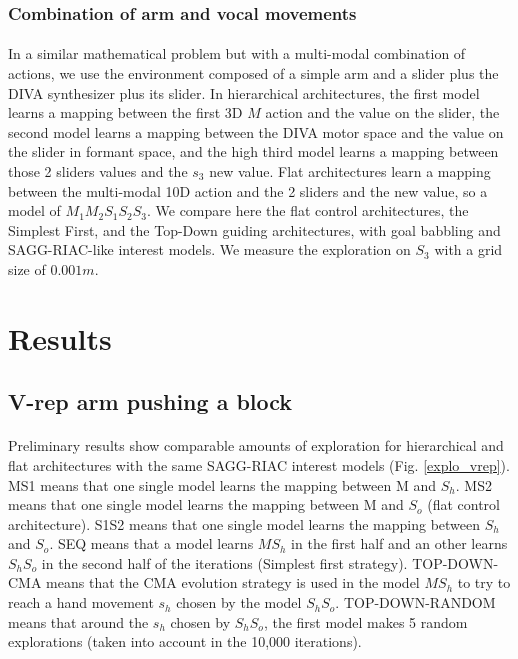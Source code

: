 \documentclass[12pt]{article}
\begin{document}

				
		\subsubsection{Combination of arm and vocal movements}

			\paragraph{}
			In a similar mathematical problem but with a multi-modal combination of actions, we use the environment composed of a simple arm and a slider plus
			the DIVA synthesizer plus its slider.
			In hierarchical architectures, the first model learns a mapping between the first 3D $M$ action and the value on the slider, the
			 second model learns a mapping between the DIVA motor space and the value on the slider in formant space, and the high third model learns a 
			 mapping between those 2 sliders values and the $s_3$ new value.
			Flat architectures learn a mapping between the multi-modal 10D action and the 2 sliders and the new value, so a model of $M_1M_2S_1S_2S_3$.
			We compare here the flat control architectures, the Simplest First, and the Top-Down guiding architectures, with goal babbling and SAGG-RIAC-like
			interest models. We measure the exploration on $S_3$ with a grid size of $0.001m$.

		
		
	
		
\section{Results}

	\subsection{V-rep arm pushing a block}
	\label{result:tdd}
		\paragraph{}
		Preliminary results show comparable amounts of exploration for hierarchical and flat architectures 
		with the same SAGG-RIAC interest models (Fig. \ref{explo_vrep}).
		MS1 means that one single model learns the mapping between M and $S_h$. MS2 means that one single model learns the mapping between M and $S_o$ (flat control architecture).
		S1S2 means that one single model learns the mapping between $S_h$ and $S_o$. SEQ means that a model learns $MS_h$ in the first half and an other learns $S_hS_o$ 
		in the second half of the iterations (Simplest first strategy). TOP-DOWN-CMA means that the CMA evolution strategy is used in the model $MS_h$ to try to reach a hand movement 
		$s_h$ chosen by the model $S_hS_o$. TOP-DOWN-RANDOM means that around the $s_h$ chosen by $S_hS_o$, the first model makes 5 random explorations (taken into account in the 10,000 iterations).
\end{document}
